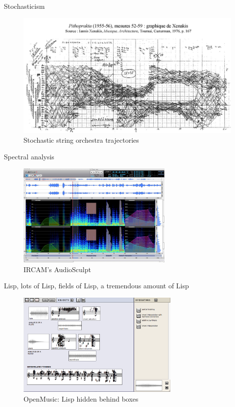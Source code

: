 \begin{frame}{Stochasticism}
    \begin{figure}
    \begin{centering}
    \includegraphics[max width=\linewidth]{assets/include-xenakis-pithoprakta.jpg}
    \caption{Stochastic string orchestra trajectories}
    \end{centering}
    \end{figure}
\end{frame}

\begin{frame}{Spectral analysis}
    \begin{figure}
    \begin{centering}
    \includegraphics[height=2in]{assets/include-audiosculpt.jpg}
    \caption{IRCAM's AudioSculpt}
    \end{centering}
    \end{figure}
\end{frame}

\begin{frame}{Lisp, lots of Lisp, fields of Lisp, a tremendous amount of Lisp}
    \begin{figure}
    \begin{centering}
    \includegraphics[height=2in]{assets/include-open-music.png}
    \caption{OpenMusic: Lisp hidden behind boxes}
    \end{centering}
    \end{figure}
\end{frame}

